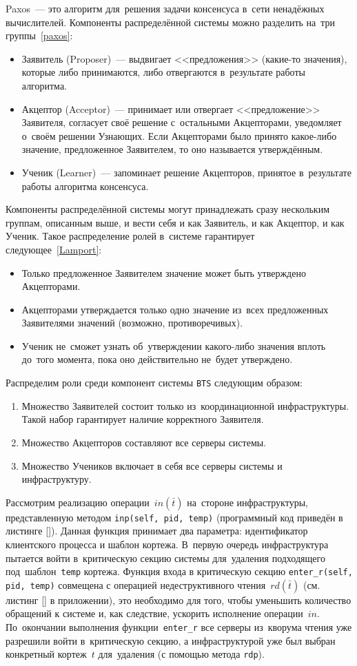 Paxos~--- это алгоритм для~решения задачи консенсуса в~сети ненадёжных вычислителей. Компоненты распределённой системы можно разделить на~три группы~\ref{paxos}:
\begin{itemize}
	\item Заявитель (Proposer)~--- выдвигает <<предложения>> (какие-то значения), которые либо принимаются, либо отвергаются в~результате работы алгоритма.
	\item Акцептор (Acceptor)~--- принимает или отвергает <<предложение>> Заявителя, согласует своё решение с~остальными Акцепторами, уведомляет о~своём решении Узнающих. Если Акцепторами было принято какое-либо значение, предложенное Заявителем, то оно называется утверждённым.
	\item Ученик (Learner)~--- запоминает решение Акцепторов, принятое в~результате работы алгоритма консенсуса.
\end{itemize}

Компоненты распределённой системы могут принадлежать сразу нескольким группам, описанным выше, и вести себя и как Заявитель, и как Акцептор, и как Ученик. Такое распределение ролей в~системе гарантирует следующее~\ref{Lamport}:
\begin{itemize}
	\item Только предложенное Заявителем значение может быть утверждено Акцепторами.
	\item Акцепторами утверждается только одно значение из~всех предложенных Заявителями значений (возможно, противоречивых).
	\item Ученик не~сможет узнать об~утверждении какого-либо значения вплоть до~того момента, пока оно действительно не~будет утверждено.
\end{itemize}

Распределим роли среди компонент системы \texttt{BTS} следующим образом:
\begin{enumerate}
	\item Множество Заявителей состоит только из~координационной инфраструктуры. Такой набор гарантирует наличие корректного Заявителя.
	\item Множество Акцепторов составляют все серверы системы.
	\item Множество Учеников включает в себя все серверы системы и инфраструктуру.
\end{enumerate}

Рассмотрим реализацию операции~$in(\bar t)$ на~стороне инфраструктуры, представленную методом \texttt{inp(self, pid, temp)} (программный код приведён в листинге \ref{}). Данная функция принимает два параметра: идентификатор клиентского процесса и шаблон кортежа. В~первую очередь инфраструктура пытается войти в~критическую секцию системы для~удаления подходящего под~шаблон~\texttt{temp} кортежа. Функция входа в критическую секцию \texttt{enter_r(self, pid, temp)} совмещена с операцией недеструктивного чтения~$rd(\bar t)$ (см.\,листинг \ref{} в приложении), это необходимо для того, чтобы уменьшить количество обращений к системе и, как следствие, ускорить исполнение операции~$in$. По~окончании выполнения функции~\texttt{enter_r} все серверы из~кворума чтения уже разрешили войти в~критическую секцию, а инфраструктурой уже был выбран конкретный кортеж~$t$ для~удаления (с помощью метода \texttt{rdp}).

